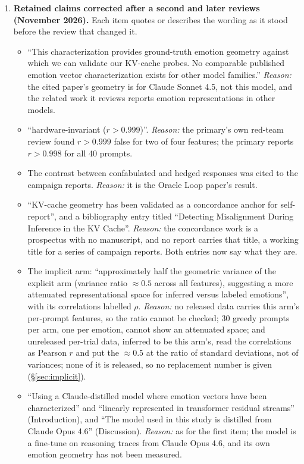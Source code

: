 \documentclass[11pt,a4paper]{article}
\begin{document}
\begin{enumerate}[leftmargin=*]
\begin{itemize}[nosep]
    \end{itemize}
    \item \label{app:item:secondread}\textbf{Retained claims corrected after a second and later reviews (November 2026).} Each item quotes or describes the wording as it stood before the review that changed it.
    \begin{itemize}[nosep]
        \item ``This characterization provides ground-truth emotion geometry against which we can validate our KV-cache probes. No comparable published emotion vector characterization exists for other model families.'' \emph{Reason:} the cited paper's geometry is for Claude Sonnet 4.5, not this model, and the related work it reviews reports emotion representations in other models.
        \item ``hardware-invariant ($r > 0.999$)''. \emph{Reason:} the primary's own red-team review found $r > 0.999$ false for two of four features; the primary reports $r > 0.998$ for all 40 prompts.
        \item The contrast between confabulated and hedged responses was cited to the campaign reports. \emph{Reason:} it is the Oracle Loop paper's result.
        \item ``KV-cache geometry has been validated as a concordance anchor for self-report'', and a bibliography entry titled ``Detecting Misalignment During Inference in the {KV} Cache''. \emph{Reason:} the concordance work is a prospectus with no manuscript, and no report carries that title, a working title for a series of campaign reports. Both entries now say what they are.
        \item The implicit arm: ``approximately half the geometric variance of the explicit arm (variance ratio $\approx 0.5$ across all features), suggesting a more attenuated representational space for inferred versus labeled emotions'', with its correlations labelled $\rho$. \emph{Reason:} no released data carries this arm's per-prompt features, so the ratio cannot be checked; 30 greedy prompts per arm, one per emotion, cannot show an attenuated space; and unreleased per-trial data, inferred to be this arm's, read the correlations as Pearson $r$ and put the $\approx 0.5$ at the ratio of standard deviations, not of variances; none of it is released, so no replacement number is given (\S\ref{sec:implicit}).
        \item ``Using a Claude-distilled model where emotion vectors have been characterized'' and ``linearly represented in transformer residual streams'' (Introduction), and ``The model used in this study is distilled from Claude Opus 4.6'' (Discussion). \emph{Reason:} as for the first item; the model is a fine-tune on reasoning traces from Claude Opus 4.6, and its own emotion geometry has not been measured.

\end{itemize}
\end{enumerate}
\end{document}
